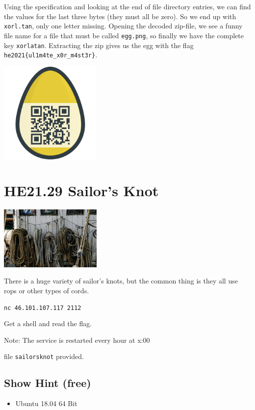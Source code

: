 \documentclass[english,a4paper,nols,noindent]{tufte-handout}
\begin{document}
Using the specification and looking at the end of file directory entries, we
can find the values for the last three bytes (they must all be zero).  So we
end up with \verb+xorl.tan+, only one letter missing.  Opening the decoded
zip-file, we see a funny file name for a file that must be called
\verb+egg.png+, so finally we have the complete key \verb+xorlatan+. Extracting
the zip gives us the egg with the flag \verb+he2021{ul1m4te_x0r_m4st3r}+.

\begin{marginfigure}
    \includegraphics[width=50mm]{ch28/egg.png}
\end{marginfigure}


\hypertarget{he21.29}{%
\section{HE21.29 Sailor's Knot}
  \label{he21.29}}
\begin{marginfigure}
    \includegraphics[width=50mm]{images/challenge29.jpg}
\end{marginfigure}

\noindent There is a huge variety of sailor's knots, but the common thing is they all use rops
or other types of cords.

\verb+nc 46.101.107.117 2112+

Get a shell and read the flag.

Note: The service is restarted every hour at x:00

file \verb+sailorsknot+ provided.

\subsection{Show Hint (free)}
\begin{itemize}
\item Ubuntu 18.04 64 Bit
\end{itemize}
\end{document}
